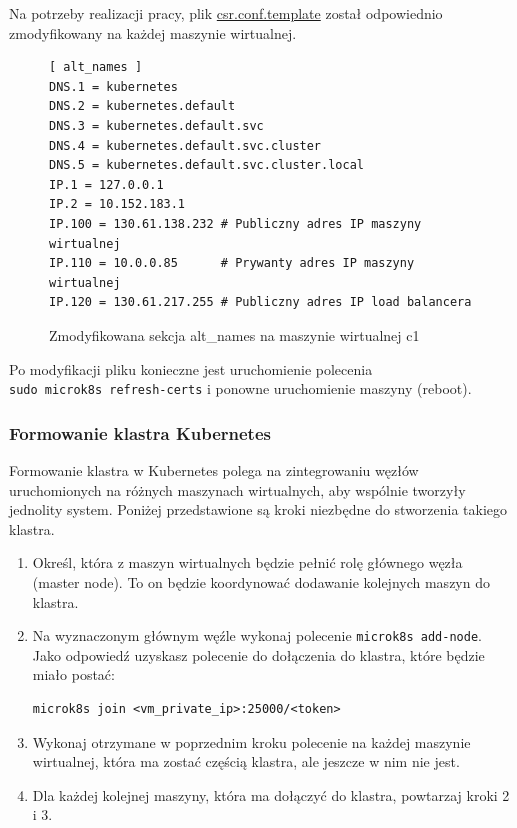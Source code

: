 Na potrzeby realizacji pracy, plik \url{csr.conf.template} został odpowiednio zmodyfikowany na każdej maszynie wirtualnej.

\begin{figure}[H]
    \begin{verbatim}
[ alt_names ]
DNS.1 = kubernetes
DNS.2 = kubernetes.default
DNS.3 = kubernetes.default.svc
DNS.4 = kubernetes.default.svc.cluster
DNS.5 = kubernetes.default.svc.cluster.local
IP.1 = 127.0.0.1
IP.2 = 10.152.183.1
IP.100 = 130.61.138.232 # Publiczny adres IP maszyny wirtualnej
IP.110 = 10.0.0.85      # Prywanty adres IP maszyny wirtualnej
IP.120 = 130.61.217.255 # Publiczny adres IP load balancera
    \end{verbatim}
    \caption{Zmodyfikowana sekcja alt\_names na maszynie wirtualnej c1}
    \label{fig:zmodyfikowana-konfiguracja-alt-names}
\end{figure}

Po modyfikacji pliku konieczne jest uruchomienie polecenia \\\texttt{sudo microk8s refresh-certs} i ponowne uruchomienie maszyny (reboot).

\subsubsection{Formowanie klastra Kubernetes}

Formowanie klastra w Kubernetes polega na zintegrowaniu węzłów uruchomionych na różnych maszynach wirtualnych, aby wspólnie tworzyły jednolity system. Poniżej przedstawione są kroki niezbędne do stworzenia takiego klastra.

\begin{enumerate}
    \item Określ, która z maszyn wirtualnych będzie pełnić rolę głównego węzła (master node). To on będzie koordynować dodawanie kolejnych maszyn do klastra.
    \item Na wyznaczonym głównym węźle wykonaj polecenie \texttt{microk8s add-node}. Jako odpowiedź uzyskasz polecenie do dołączenia do klastra, które będzie miało postać:
    \begin{verbatim}
microk8s join <vm_private_ip>:25000/<token>
    \end{verbatim}
    \item Wykonaj otrzymane w poprzednim kroku polecenie na każdej maszynie wirtualnej, która ma zostać częścią klastra, ale jeszcze w nim nie jest.
    \item Dla każdej kolejnej maszyny, która ma dołączyć do klastra, powtarzaj kroki 2 i 3.
\end{enumerate}

